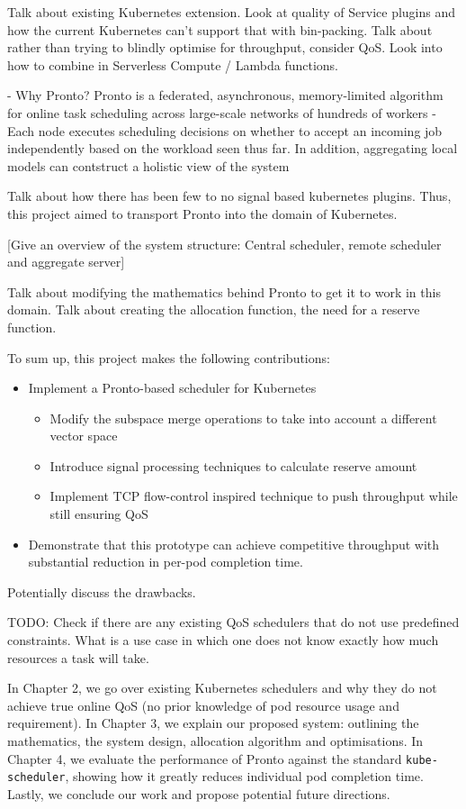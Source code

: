 Talk about existing Kubernetes extension. Look at quality of Service plugins and
how the current Kubernetes can't support that with bin-packing. Talk about
rather than trying to blindly optimise for throughput, consider QoS. Look into
how to combine in Serverless Compute / Lambda functions.

- Why Pronto? Pronto is a federated, asynchronous, memory-limited algorithm for
online task scheduling across large-scale networks of hundreds of workers
- Each node executes scheduling decisions on whether to accept an incoming job
independently based on the workload seen thus far. In addition, aggregating
local models can contstruct a holistic view of the system

Talk about how there has been few to no signal based kubernetes plugins. Thus,
this project aimed to transport Pronto into the domain of Kubernetes.

[Give an overview of the system structure: Central scheduler, remote scheduler
and aggregate server]

Talk about modifying the mathematics behind Pronto to get it to work in this
domain. Talk about creating the allocation function, the need for a reserve
function.

To sum up, this project makes the following contributions:
\begin{itemize}
\item Implement a Pronto-based scheduler for Kubernetes\\
    \begin{itemize}
    \item Modify the subspace merge operations to take into account a different
    vector space
    \item Introduce signal processing techniques to calculate reserve amount
    \item Implement TCP flow-control inspired technique to push throughput while
    still ensuring QoS
    \end{itemize}
\item Demonstrate that this prototype can achieve competitive throughput with
substantial reduction in per-pod completion time.
\end{itemize}

Potentially discuss the drawbacks.

TODO: Check if there are any existing QoS schedulers that do not use predefined
constraints. What is a use case in which one does not know exactly how much
resources a task will take.

In Chapter 2, we go over existing Kubernetes schedulers and why they do not
achieve true online QoS (no prior knowledge of pod resource usage and
requirement). In Chapter 3, we explain our proposed system: outlining the
mathematics, the system design, allocation algorithm and optimisations. In
Chapter 4, we evaluate the performance of Pronto against the standard
\verb|kube-scheduler|, showing how it greatly reduces individual pod completion
time. Lastly, we conclude our work and propose potential future directions.
